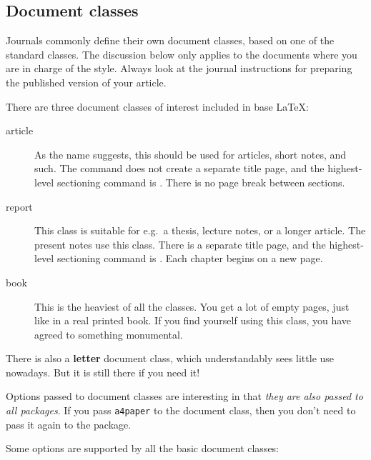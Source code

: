 %
\subsection{Document classes}\label{sec:document classes}

\begin{practices}
Journals commonly define their own document classes, based on one of the standard classes.
The discussion below only applies to the documents where you are in charge of the style.
Always look at the journal instructions for preparing the published version of your article.
\end{practices}

There are three document classes of interest included in base \LaTeX{}:

\begin{description}
\item[article] As the name suggests, this should be used for articles, short notes, and such.
    The  command does not create a separate title page,
    and the highest-level sectioning command is .
    There is no page break between sections.
\item[report] This class is suitable for e.g.\ a thesis, lecture notes, or a longer article.
    The present notes use this class.
    There is a separate title page,
    and the highest-level sectioning command is .
    Each chapter begins on a new page.
\item[book] This is the heaviest of all the classes.
    You get a lot of empty pages, just like in a real printed book.
    If you find yourself using this class,
    you have agreed to something monumental.
\end{description}
%
There is also a \textbf{letter} document class,
which understandably sees little use nowadays.
But it is still there if you need it!

Options passed to document classes are interesting in that
\emph{they are also passed to all packages}.
If you pass \verb|a4paper| to the document class,
then you don't need to pass it again to the  package.

Some options are supported by all the basic document classes:

